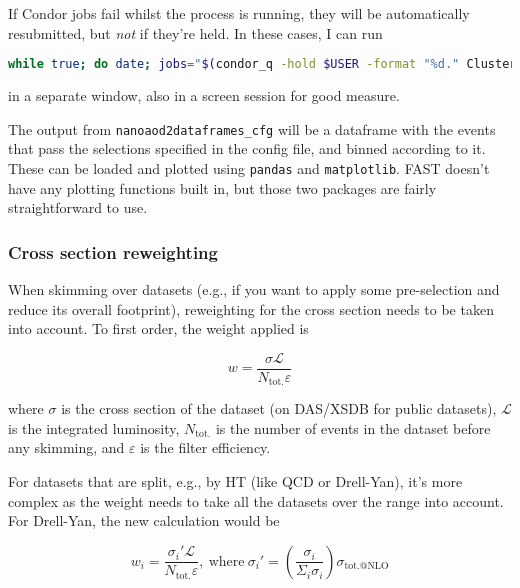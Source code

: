 If Condor jobs fail whilst the process is running, they will be automatically resubmitted, but \emph{not} if they're held. In these cases, I can run

\begin{lstlisting}[belowskip=-0.7cm, language=sh, numbers=none]
while true; do date; jobs="$(condor_q -hold $USER -format "%d." ClusterId -format "%d " ProcId)"; [ -n "$jobs" ] && condor_release $jobs; sleep 120; done
\end{lstlisting}

in a separate window, also in a screen session for good measure. 

The output from \texttt{nanoaod2dataframes\_cfg} will be a dataframe with the events that pass the selections specified in the config file, and binned according to it. These can be loaded and plotted using \texttt{pandas} and \texttt{matplotlib}. FAST doesn't have any plotting functions built in, but those two packages are fairly straightforward to use. 


\subsubsection{Cross section reweighting}

When skimming over datasets (e.g., if you want to apply some pre-selection and reduce its overall footprint), reweighting for the cross section needs to be taken into account. To first order, the weight applied is

\begin{equation}
w = \frac{ \sigma \mathcal{L} }{ N_{\mathrm{tot.}} \varepsilon }
\end{equation}

where $\sigma$ is the cross section of the dataset (on DAS/XSDB for public datasets), $\mathcal{L}$ is the integrated luminosity, $N_{\mathrm{tot.}}$ is the number of events in the dataset before any skimming, and $\varepsilon$ is the filter efficiency.

For datasets that are split, e.g., by HT (like QCD or Drell-Yan), it's more complex as the weight needs to take all the datasets over the range into account. For Drell-Yan, the new calculation would be

\begin{equation}
w_i = \frac{ \sigma_i ' \mathcal{L} }{ N_{\mathrm{tot.}} \varepsilon }, \ \mathrm{where} \ \sigma_i ' = \left( \frac{\sigma_i}{\Sigma_i \sigma_i} \right) \sigma_{\mathrm{tot.@NLO}}
\end{equation}

